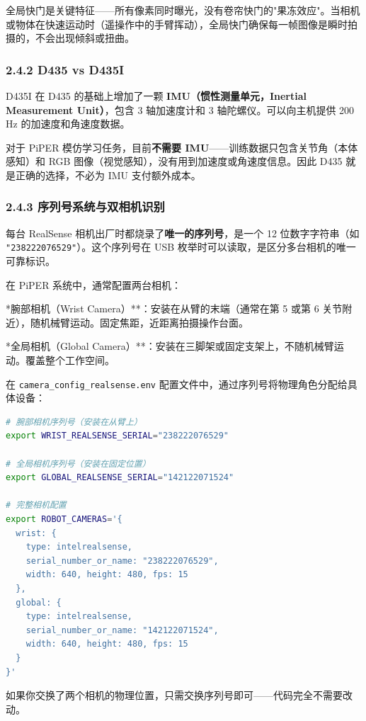 \documentclass[UTF8,a4paper,11pt]{ctexart}
\begin{document}
全局快门是关键特征——所有像素同时曝光，没有卷帘快门的"果冻效应"。当相机或物体在快速运动时（遥操作中的手臂挥动），全局快门确保每一帧图像是瞬时拍摄的，不会出现倾斜或扭曲。

\subsubsection{2.4.2 D435 vs D435I}

D435I 在 D435 的基础上增加了一颗 \textbf{IMU（惯性测量单元，Inertial Measurement Unit）}，包含 3 轴加速度计和 3 轴陀螺仪。可以向主机提供 200 Hz 的加速度和角速度数据。

对于 PiPER 模仿学习任务，目前\textbf{不需要 IMU}——训练数据只包含关节角（本体感知）和 RGB 图像（视觉感知），没有用到加速度或角速度信息。因此 D435 就是正确的选择，不必为 IMU 支付额外成本。

\subsubsection{2.4.3 序列号系统与双相机识别}

每台 RealSense 相机出厂时都烧录了\textbf{唯一的序列号}，是一个 12 位数字字符串（如 \texttt{"238222076529"}）。这个序列号在 USB 枚举时可以读取，是区分多台相机的唯一可靠标识。

在 PiPER 系统中，通常配置两台相机：

\item **腕部相机（Wrist Camera）**：安装在从臂的末端（通常在第 5 或第 6 关节附近），随机械臂运动。固定焦距，近距离拍摄操作台面。
\item **全局相机（Global Camera）**：安装在三脚架或固定支架上，不随机械臂运动。覆盖整个工作空间。

在 \texttt{camera_config_realsense.env} 配置文件中，通过序列号将物理角色分配给具体设备：

\begin{lstlisting}[language=bash]
# 腕部相机序列号（安装在从臂上）
export WRIST_REALSENSE_SERIAL="238222076529"

# 全局相机序列号（安装在固定位置）
export GLOBAL_REALSENSE_SERIAL="142122071524"

# 完整相机配置
export ROBOT_CAMERAS='{
  wrist: {
    type: intelrealsense,
    serial_number_or_name: "238222076529",
    width: 640, height: 480, fps: 15
  },
  global: {
    type: intelrealsense,
    serial_number_or_name: "142122071524",
    width: 640, height: 480, fps: 15
  }
}'
\end{lstlisting}

如果你交换了两个相机的物理位置，只需交换序列号即可——代码完全不需要改动。
\end{document}
